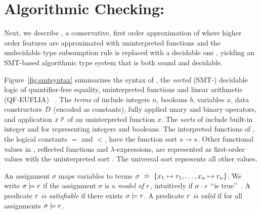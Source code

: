 \section{Algorithmic Checking: \smtlan}
\label{sec:theory:algorithmic}
\label{sec:algorithmic}

Next, we describe \smtlan, a conservative, first order
approximation of \corelan where higher order features are
approximated with uninterpreted functions
and the undecidable type subsumption rule \rsubbasecore
is replaced with a decidable one \rsubbasesmt, yielding
an SMT-based algorithmic type system that is both sound and
decidable.

%
Figure~\ref{fig:smtsyntax} summarizes the syntax
of \smtlan, the \emph{sorted} (SMT-)
decidable logic of quantifier-free equality,
uninterpreted functions and linear
arithmetic (QF-EUFLIA) ~\citep{Nelson81,SMTLIB2}.
%
The \emph{terms} of \smtlan include
integers $n$,
booleans $b$,
variables $x$,
data constructors $D$ (encoded as constants),
fully applied unary \unop and binary \binop operators,
and application $x\ \overline{r}$ of an uninterpreted function $x$.
%
The \emph{sorts} of \smtlan include built-in
integer \tint and \tbool for representing
integers and booleans.
%
The interpreted functions of \smtlan, \eg
the logical constants $=$ and $<$,
have the function sort $s \rightarrow s$.
%
Other functional values in \corelan, \eg
reflected \corelan functions and
$\lambda$-expressions, are represented as
first-order values with
the uninterpreted sort \tsmtfun{\sort}{\sort}.
%
The universal sort \tuniv represents all other values.

%
An assignment $\sigma$ maps
variables to terms
%
$\sigma \defeq \{ \assignto{x_1}{\pred_1}, \ldots, \assignto{x_n}{\pred_n}\}$.
%
We write
%
${\sigma \models r}$
%
if the assignment $\sigma$ is a
\emph{model of} $r$, intuitively
if ${\sigma} \cdot {\ensuremath{r}} $ ``is true''~\cite{Nelson81}.
%
A predicate $r$ \emph{is satisfiable} if
there exists ${\sigma\models r}$.
%
A predicate $r$ \emph{is valid} if
for all assignments ${\sigma\models r}$.


